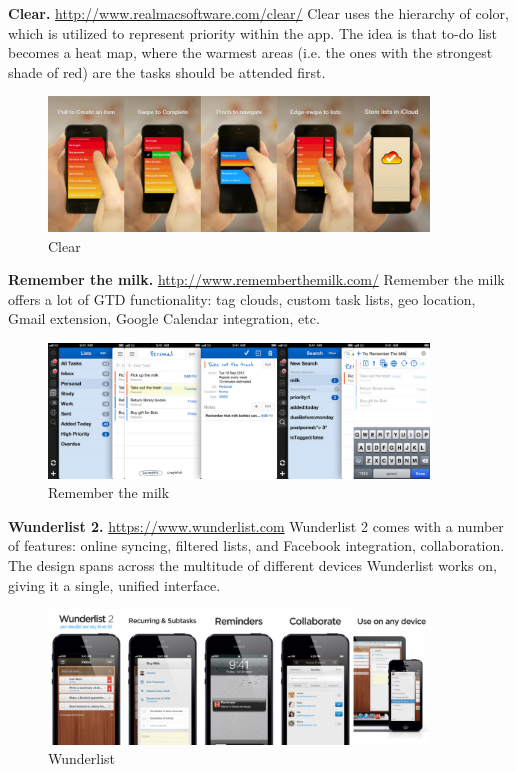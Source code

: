 \textbf{Clear.} \url{http://www.realmacsoftware.com/clear/} Clear uses the hierarchy of color, which is utilized to represent priority within the app. The idea is that to-do list becomes a heat map, where the warmest areas (i.e. the ones with the strongest shade of red) are the tasks should be attended first.

\begin{figure}
   \centering
	\includegraphics[width=0.9\textwidth]{resources/clear.pdf}
	\caption[Clear]{Clear}
\end{figure}

\textbf{Remember the milk.} \url{http://www.rememberthemilk.com/} Remember the milk offers a lot of GTD functionality: tag clouds, custom task lists, geo location, Gmail extension, Google Calendar integration, etc.

\begin{figure}
   \centering
	\includegraphics[width=0.9\textwidth]{resources/remember-the-milk.pdf}
	\caption[Remember the milk]{Remember the milk}
\end{figure}

\textbf{Wunderlist 2.} \url{https://www.wunderlist.com} Wunderlist 2 comes with a number of features: online syncing, filtered lists, and Facebook integration, collaboration. The design spans across the multitude of different devices Wunderlist works on, giving it a single, unified interface.

\begin{figure}
   \centering
	\includegraphics[width=0.9\textwidth]{resources/wunderlist.pdf}
	\caption[Wunderlist]{Wunderlist}
\end{figure}


